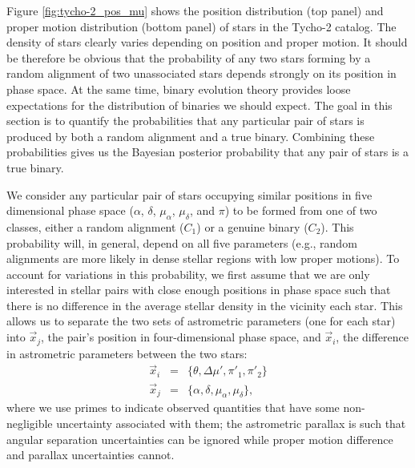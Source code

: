 \documentclass[usenatbib]{mnras}
\begin{document}
Figure \ref{fig:tycho-2_pos_mu} shows the position distribution (top panel) and proper motion distribution (bottom panel) of stars in the Tycho-2 catalog. The density of stars clearly varies depending on position and proper motion. It should be therefore be obvious that the probability of any two stars forming by a random alignment of two unassociated stars depends strongly on its position in phase space. At the same time, binary evolution theory provides loose expectations for the distribution of binaries we should expect. The goal in this section is to quantify the probabilities that any particular pair of stars is produced by both a random alignment and a true binary. Combining these probabilities gives us the Bayesian posterior probability that any pair of stars is a true binary. 



We consider any particular pair of stars occupying similar positions in five dimensional phase space ($\alpha$, $\delta$, $\mu_{\alpha}$, $\mu_{\delta}$, and $\pi$) to be formed from one of two classes, either a random alignment ($C_1$) or a genuine binary ($C_2$). This probability will, in general, depend on all five parameters (e.g., random alignments are more likely in dense stellar regions with low proper motions). To account for variations in this probability, we first assume that we are only interested in stellar pairs with close enough positions in phase space such that there is no difference in the average stellar density in the vicinity each star. This allows us to separate the two sets of astrometric parameters (one for each star) into $\vec{x}_j$, the pair's position in four-dimensional phase space, and $\vec{x}_i$, the difference in astrometric parameters between the two stars:
\begin{eqnarray}
\vec{x}_i &=& \{\theta, \Delta \mu', \pi'_1, \pi'_2 \} \\
\vec{x}_j &=& \{ \alpha, \delta, \mu_{\alpha}, \mu_{\delta} \},
\end{eqnarray}
where we use primes to indicate observed quantities that have some non-negligible uncertainty associated with them; the astrometric parallax is such that angular separation uncertainties can be ignored while proper motion difference and parallax uncertainties cannot. 
\end{document}
